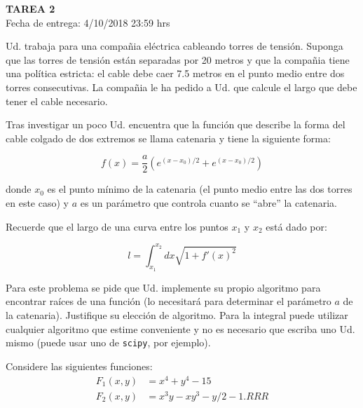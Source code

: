 \documentclass[letter, 11pt]{article}
\newcommand{\scipy}{\texttt{scipy}}
\newcommand{\tareanro}{2}
\newcommand{\fechaentrega}{4/10/2018 23:59 hrs}
\begin{document}
\thispagestyle{firstpage}

\begin{center}
  {\uppercase{\LARGE \bf Tarea \tareanro}}\\
  Fecha de entrega: \fechaentrega
\end{center}



Ud. trabaja para una compañia eléctrica cableando torres de tensión. Suponga
que las torres de tensión están separadas por 20 metros y que la compañia tiene
una política estricta: el cable debe caer 7.5 metros en el punto medio entre
dos torres consecutivas. La compañia le ha pedido a Ud. que calcule el largo
que debe tener el cable necesario.

Tras investigar un poco Ud. encuentra que la función que describe la forma del
cable colgado de dos extremos se llama catenaria y tiene la siguiente forma:

$$ f(x) = \frac{a}{2} \left( e^{(x-x_0)/2} + e^ {(x-x_0)/2} \right) $$

\noindent donde $x_0$ es el punto mínimo de la catenaria (el punto medio entre
las dos torres en este caso) y $a$ es un parámetro que controla cuanto se
``abre'' la catenaria.

\begin{ayuda}
  \small
  Recuerde que el largo de una curva entre los puntos $x_1$ y $x_2$ está dado
  por:

  $$ l = \int_{x_1}^{x_2}dx\sqrt{1 + f'(x)^2} $$

\end{ayuda}

Para este problema se pide que Ud. implemente su propio algoritmo para
encontrar raíces de una función (lo necesitará para determinar el parámetro $a$
de la catenaria). Justifique su elección de algoritmo. Para la integral puede
utilizar cualquier algoritmo que estime conveniente y no es necesario que
escriba uno Ud. mismo (puede usar uno de \scipy, por ejemplo).


\vspace{1.5em}

Considere las siguientes funciones:
  \begin{align}
    F_1(x, y) &= x^4 + y^4 - 15 \label{eq1}\\
    F_2(x, y) &= x^3y - xy^3 - y/2 - 1.RRR \label{eq2}
  \end{align}
\end{document}
